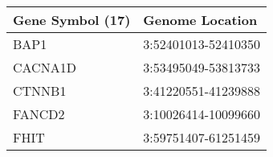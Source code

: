 \begin{tabular}{ll}
\toprule
Gene Symbol (17) &     Genome Location \\
\midrule
            BAP1 & 3:52401013-52410350 \\
         CACNA1D & 3:53495049-53813733 \\
          CTNNB1 & 3:41220551-41239888 \\
          FANCD2 & 3:10026414-10099660 \\
            FHIT & 3:59751407-61251459 \\
\bottomrule
\end{tabular}
